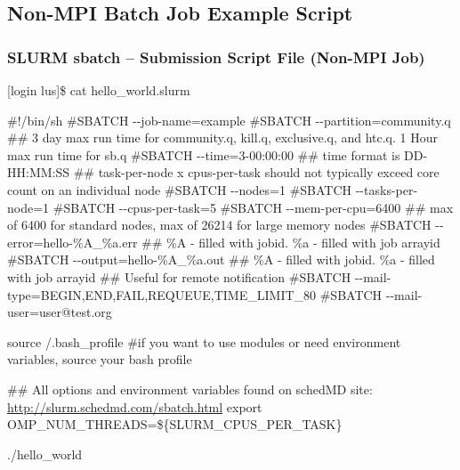 \documentclass[t,hyperref={pdfpagelabels=false}]{beamer}
\newcommand{\ctilde}{{\fontfamily{ptm}\selectfont\texttildelow}}
\newcommand{\ddash}{-{}-}
\begin{document}
\subsection{Non-MPI Batch Job Example Script}
\begin{frame}[fragile]
\frametitle{SLURM sbatch -- Submission Script File (Non-MPI Job)}
\begin{semiverbatim}\tiny
[login lus]\$ cat hello_world.slurm

\#!/bin/sh
\#SBATCH \ddash{}job-name=example
\#SBATCH \ddash{}partition=community.q
\#\# 3 day max run time for community.q, kill.q, exclusive.q, and htc.q.  1 Hour max run time for sb.q
\#SBATCH \ddash{}time=3-00:00:00 ## time format is DD-HH:MM:SS
\#\# task-per-node x cpus-per-task should not typically exceed core count on an individual node 
\#SBATCH \ddash{}nodes=1
\#SBATCH \ddash{}tasks-per-node=1
\#SBATCH \ddash{}cpus-per-task=5
\#SBATCH \ddash{}mem-per-cpu=6400 \#\# max of 6400 for standard nodes, max of 26214 for large memory nodes                                                                                                                                              
\#SBATCH \ddash{}error=hello-\%A\_\%a.err \#\# \%A - filled with jobid. \%a - filled with job arrayid
\#SBATCH \ddash{}output=hello-\%A\_\%a.out \#\# \%A - filled with jobid. \%a - filled with job arrayid
\#\# Useful for remote notification
\#SBATCH \ddash{}mail-type=BEGIN,END,FAIL,REQUEUE,TIME\_LIMIT\_80
\#SBATCH \ddash{}mail-user=user@test.org

source \ctilde/.bash_profile \#if you want to use modules or need environment variables, source your bash profile

\#\# All options and environment variables found on schedMD site: \href{http://slurm.schedmd.com/sbatch.html}{http://slurm.schedmd.com/sbatch.html}
export OMP\_NUM\_THREADS=\$\{SLURM\_CPUS\_PER\_TASK\}

./hello\_world
\end{semiverbatim}
\end{frame}
\end{document}
